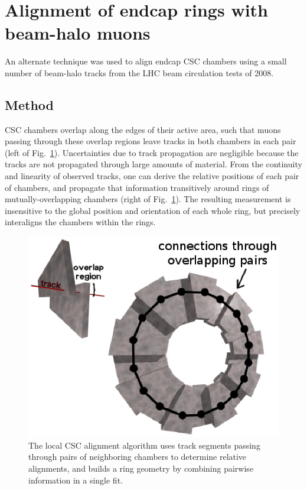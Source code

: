 \section{Alignment of endcap rings with beam-halo muons}
\label{sec:two}

An alternate technique was used to align endcap CSC chambers using a
small number of beam-halo tracks from the LHC beam circulation tests
of 2008.

\subsection{Method}

CSC chambers overlap along the edges of their active area, such that
muons passing through these overlap regions leave tracks in both
chambers in each pair (left of Fig.~\ref{overlaps_explantion}).
Uncertainties due to track propagation are negligible because the
tracks are not propagated through large amounts of material.  From the
continuity and linearity of observed tracks, one can derive the
relative positions of each pair of chambers, and propagate that
information transitively around rings of mutually-overlapping chambers
(right of Fig.~\ref{overlaps_explantion}).  The resulting measurement
is insensitive to the global position and orientation of each whole
ring, but precisely interaligns the chambers within the rings.

\begin{figure}
\centering
\includegraphics[width=0.8\linewidth]{matrix_description_onestation.eps}
\caption{The local CSC alignment algorithm uses track segments passing through pairs of neighboring chambers to determine relative alignments, and builds a ring geometry by combining pairwise information in a single fit.} \label{overlaps_explantion}
\end{figure}

